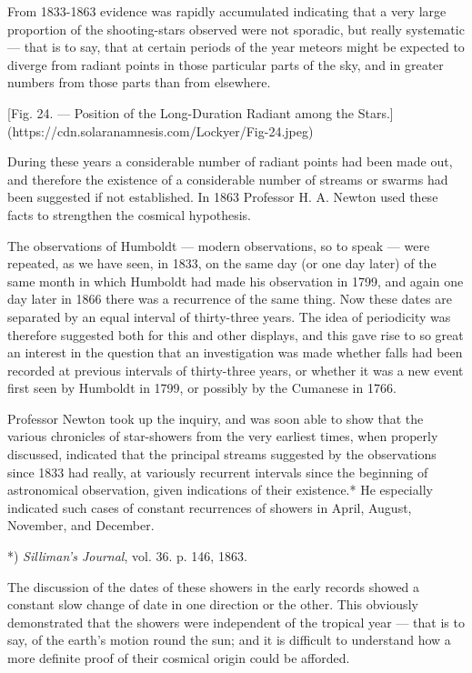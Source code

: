 \documentclass[a4paper, 12pt, oneside, polutonikogreek, english]{article}
\begin{document}
From 1833-1863 evidence was rapidly accumulated indicating that a very large proportion of the shooting-stars observed were not sporadic, but really systematic --- that is to say, that at certain periods of the year meteors might be expected to diverge from radiant points in those particular parts of the sky, and in greater numbers from those parts than from elsewhere.

[Fig. 24. --- Position of the Long-Duration Radiant among the Stars.](https://cdn.solaranamnesis.com/Lockyer/Fig-24.jpeg)

During these years a considerable number of radiant points had been made out, and therefore the existence of a considerable number of streams or swarms had been suggested if not established. In 1863 Professor H. A. Newton used these facts to strengthen the cosmical hypothesis.

The observations of Humboldt --- modern observations, so to speak --- were repeated, as we have seen, in 1833, on the same day (or one day later) of the same month in which Humboldt had made his observation in 1799, and again one day later in 1866 there was a recurrence of the same thing. Now these dates are separated by an equal interval of thirty-three years. The idea of periodicity was therefore suggested both for this and other displays, and this gave rise to so great an interest in the question that an investigation was made whether falls had been recorded at previous intervals of thirty-three years, or whether it was a new event first seen by Humboldt in 1799, or possibly by the Cumanese in 1766.

Professor Newton took up the inquiry, and was soon able to show that the various chronicles of star-showers from the very earliest times, when properly discussed, indicated that the principal streams suggested by the observations since 1833 had really, at variously recurrent intervals since the beginning of astronomical observation, given indications of their existence.* He especially indicated such cases of constant recurrences of showers in April, August, November, and December.

*) \emph{Silliman's Journal}, vol. 36. p. 146, 1863.

The discussion of the dates of these showers in the early records showed a constant slow change of date in one direction or the other. This obviously demonstrated that the showers were independent of the tropical year --- that is to say, of the earth's motion round the sun; and it is difficult to understand how a more definite proof of their cosmical origin could be afforded.
\end{document}

